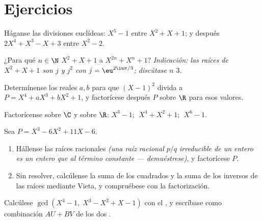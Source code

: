 \section{Ejercicios}

\begin{exercise}[$\star$]\label{exo:b1:poly:1}
Háganse las divisiones euclídeas: $X^5 - 1$ entre $X^2 + X + 1$; y
después $2X^4 + X^3 - X + 3$ entre $X^2 - 2$.
\end{exercise}

\begin{exercise}[$\star$]\label{exo:b1:poly:2}
¿Para qué $n \in \N$  $X^2 + X + 1$ a $X^{2n} + X^n + 1$?
\emph{Indicación: las raíces de $X^2 + X + 1$ son $j$ y $j^2$ con
$j = \eu^{2\iu\pi/3}$; discútase $n$  $3$.}
\end{exercise}

\begin{exercise}[$\star$]\label{exo:b1:poly:3}
Determínense los reales $a, b$ para que $(X-1)^2$ divida a
$P = X^4 + aX^3 + bX^2 + 1$, y factorícese después $P$ sobre $\R$ para esos valores.
\end{exercise}

\begin{exercise}[$\star$]\label{exo:b1:poly:4}
Factorícense sobre $\C$ y sobre $\R$: $X^3 - 1$; $\;X^4 + X^2 + 1$;
$\;X^6 - 1$.
\end{exercise}

\begin{exercise}[$\star\star$]\label{exo:b1:poly:5}
Sea $P = X^3 - 6X^2 + 11X - 6$.
\begin{enumerate}
  \item Hállense las raíces racionales \emph{(una raíz racional $p/q$
        irreducible de un  entero  es un entero que
         al término constante --- demuéstrese)}, y factorícese $P$.
  \item Sin resolver, calcúlense la suma de los cuadrados y la suma de
        los inversos de las raíces mediante Vieta, y compruébese con
        la factorización.
\end{enumerate}
\end{exercise}

\begin{exercise}[$\star\star$]\label{exo:b1:poly:6}
Calcúlese $\gcd(X^4 - 1,\; X^3 - X^2 + X - 1)$ con el , y escríbase como combinación $AU + BV$ de los dos
.
\end{exercise}

